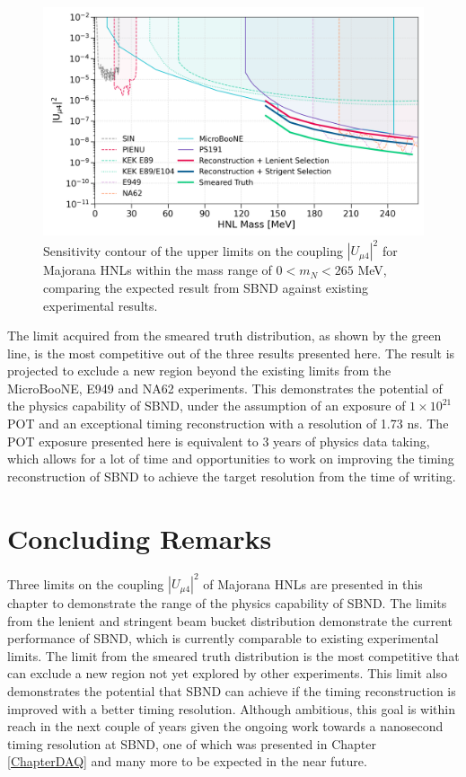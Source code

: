 \begin{figure}[bp!]
    \centering
    \includegraphics[width=\textwidth]{sensitivity}
    \caption{Sensitivity contour of the upper limits on the coupling $|U_{\mu4}|^2$ for Majorana HNLs within the mass range of $0 < m_N < 265$ MeV, comparing the expected result from SBND against existing experimental results.}
    \label{fig:sensitivity}
\end{figure}

The limit acquired from the smeared truth distribution, as shown by the green line, is the most competitive out of the three results presented here.
The result is projected to exclude a new region beyond the existing limits from the MicroBooNE, E949 and NA62 experiments.
This demonstrates the potential of the physics capability of SBND, under the assumption of an exposure of $1 \times 10^{21}$ POT and an exceptional timing reconstruction with a resolution of 1.73 ns.
The POT exposure presented here is equivalent to 3 years of physics data taking, which allows for a lot of time and opportunities to work on improving the timing reconstruction of SBND to achieve the target resolution from the time of writing.

\section{Concluding Remarks}
\label{sec:result_remarks}

Three limits on the coupling $|U_{\mu4}|^2$ of Majorana HNLs are presented in this chapter to demonstrate the range of the physics capability of SBND.
The limits from the lenient and stringent beam bucket distribution demonstrate the current performance of SBND, which is currently comparable to existing experimental limits.
The limit from the smeared truth distribution is the most competitive that can exclude a new region not yet explored by other experiments.
This limit also demonstrates the potential that SBND can achieve if the timing reconstruction is improved with a better timing resolution.
Although ambitious, this goal is within reach in the next couple of years given the ongoing work towards a nanosecond timing resolution at SBND, one of which was presented in Chapter \ref{ChapterDAQ} and many more to be expected in the near future.
 


